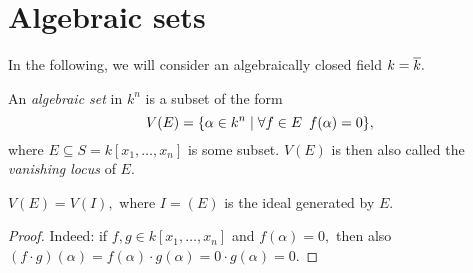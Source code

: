\section{Algebraic sets}
In the following, we will consider an algebraically closed field \(k = \overline{k}.\)
\begin{df}
  An \emph{algebraic set} in \(k^n\) is a subset of the form
  \[V(E) = \{\alpha \in k^n \mathrel{|} \forall f \in E \enspace f(\alpha) = 0\},\]
  where \(E \subseteq S = k[x_1, \dotsc, x_n]\) is some subset. \(V(E)\) is then also called the \emph{vanishing locus} of \(E.\)
\end{df}

\begin{prop}
  \label{algebraic sets ideals are enough}
  \(V(E) = V(I),\) where \(I = (E)\) is the ideal generated by \(E.\)
\end{prop}
\begin{proof}
   Indeed: if \(f, g \in k[x_1, \dotsc, x_n]\) and \(f(\alpha) = 0,\) then also \((f \cdot g)(\alpha) = f(\alpha) \cdot g(\alpha) = 0 \cdot g(\alpha) = 0.\)
\end{proof}

